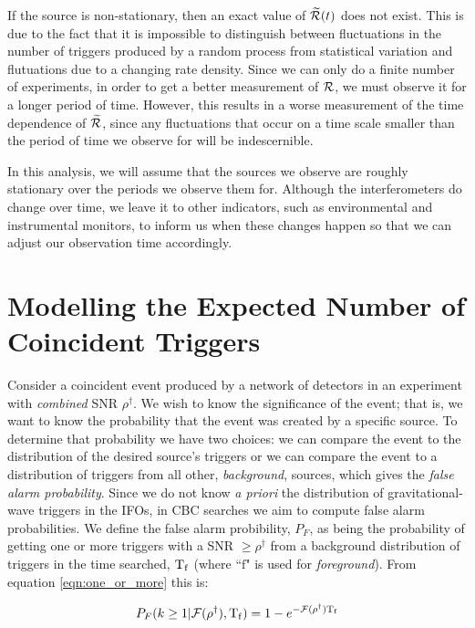 If the source is non-stationary, then an exact value of $\widetilde{\mathcal{R}}(t)$ does not exist. This is due to the fact that it is impossible to distinguish between fluctuations in the number of triggers produced by a random process from statistical variation and flutuations due to a changing rate density. Since we can only do a finite number of experiments, in order to get a better measurement of $\mathcal{R}$, we must observe it for a longer period of time. However, this results in a worse measurement of the time dependence of $\widetilde{\mathcal{R}}$, since any fluctuations that occur on a time scale smaller than the period of time we observe for will be indescernible. 

In this analysis, we will assume that the sources we observe are roughly stationary over the periods we observe them for. Although the interferometers do change over time, we leave it to other indicators, such as environmental and instrumental monitors, to inform us when these changes happen so that we can adjust our observation time accordingly.

\section{Modelling the Expected Number of Coincident Triggers}
\label{sec:coincidence_modelling}

Consider a coincident event produced by a network of detectors in an experiment with \emph{combined} \ac{SNR} $\rho^\dagger$. We wish to know the significance of the event; that is, we want to know the probability that the event was created by a specific source. To determine that probability we have two choices: we can compare the event to the distribution of the desired source's triggers or we can compare the event to a distribution of triggers from all other, \emph{background}, sources, which gives the \emph{false alarm probability}. Since we do not know \emph{a priori} the distribution of gravitational-wave triggers in the \acp{IFO}, in \ac{CBC} searches we aim to compute false alarm probabilities. We define the false alarm probibility, $P_F$, as being the probability of getting one or more triggers with a \ac{SNR} $\geq \rho^\dagger$ from a background distribution of triggers in the time searched, $\mathrm{T_f}$ (where ``$\mathrm{f}$" is used for \emph{foreground}). From equation \ref{eqn:one_or_more} this is:

\begin{equation}
P_F(k\geq1 | \mathcal{F}(\rho^\dagger), \mathrm{T_f}) = 1 - e^{-\mathcal{F}(\rho^\dagger) \mathrm{T_f}}
\end{equation}


